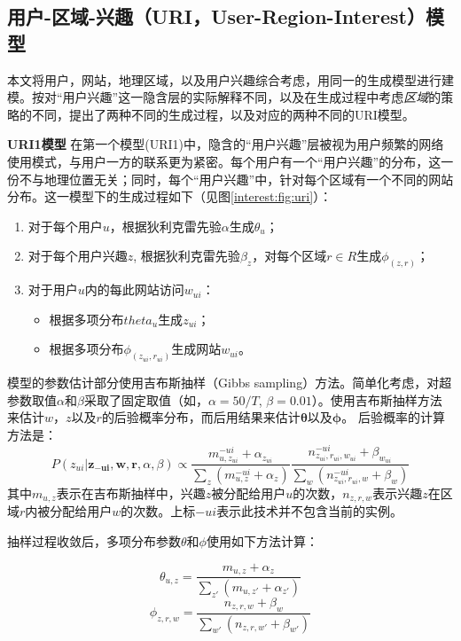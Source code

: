 \subsection{用户-区域-兴趣（URI，User-Region-Interest）模型}
本文将用户，网站，地理区域，以及用户兴趣综合考虑，用同一的生成模型进行建模。按对``用户兴趣''这一隐含层的实际解释不同，以及在生成过程中考虑\textit{区域}的策略的不同，提出了两种不同的生成过程，以及对应的两种不同的URI模型。

\textbf{URI1模型} 在第一个模型(URI1)中，隐含的``用户兴趣''层被视为用户频繁的网络使用模式，与用户一方的联系更为紧密。每个用户有一个``用户兴趣''的分布，这一份不与地理位置无关；同时，每个``用户兴趣''中，针对每个区域有一个不同的网站分布。这一模型下的生成过程如下（见图\ref{interest:fig:uri}）：
\begin{enumerate}
	\item 对于每个用户$u$，根据狄利克雷先验$\alpha$生成$\theta_u$；
	\item 对于每个用户兴趣$z$, 根据狄利克雷先验$\beta_z$，对每个区域$r \in R$生成$\phi_{(z,r)}$；
	\item 对于用户$u$内的每此网站访问$w_{ui}$：
	\begin{itemize}
		\item 根据多项分布$theta_u$生成$z_{ui}$；
		\item 根据多项分布$\phi_(z_{ui},r_{ui})$生成网站$w_{ui}$。
	\end{itemize}
\end{enumerate}

模型的参数估计部分使用吉布斯抽样（Gibbs sampling）方法\cite{nas04griffiths}。简单化考虑，对超参数取值$\alpha$和$\beta$采取了固定取值（如，$\alpha = 50 / T$, $\beta = 0.01$）。使用吉布斯抽样方法来估计$w$，$z$以及$r$的后验概率分布，而后用结果来估计$\mathbf{\theta}$以及$\mathbf{\phi}$。
后验概率的计算方法是：
	\begin{equation}
	P(z_{ui}|\mathbf{z_{-ui}},\mathbf{w}, \mathbf{r}, \alpha, \beta) \propto
	  \frac{m^{-ui}_{u,z_{ui}} + \alpha_{z_{ui}}}{\sum_{z}{(m^{-ui}_{u,z} + \alpha_z)}}
		\frac{n^{-ui}_{z_{ui},r_{ui},w_{ui}} + \beta_{w_{ui}}}{\sum_{w}{(n^{-ui}_{z_{ui},r_{ui},w} + \beta_w)}}
\end{equation}
其中$m_{u,z}$表示在吉布斯抽样中，兴趣$z$被分配给用户$u$的次数，$n_{z,r,w}$表示兴趣$z$在区域$r$内被分配给用户$w$的次数。上标$-ui$表示此技术并不包含当前的实例。

抽样过程收敛后，多项分布参数$\theta$和$\phi$使用如下方法计算：

\begin{equation}
	\theta_{u,z} = \frac{m_{u,z} + \alpha_z}{\sum_{z'}{(m_{u,z'} + \alpha_{z'})}}
\end{equation}
\begin{equation}
\label{interest:equ:phi}
	\phi_{z,r,w} = \frac{n_{z,r,w} + \beta_w}{\sum_{w'}{(n_{z,r,w'} + \beta_{w'})}}
\end{equation}

